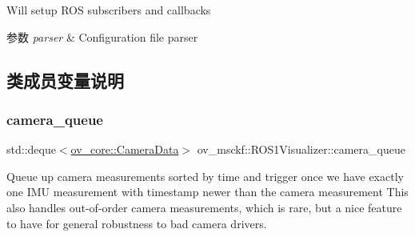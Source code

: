 Will setup R\+OS subscribers and callbacks 


\begin{DoxyParams}{参数}
{\em parser} & Configuration file parser \\
\hline
\end{DoxyParams}


\subsection{类成员变量说明}
\mbox{\label{classov__msckf_1_1ROS1Visualizer_a96e92f8bf544cc689e3fd203d3340e97}} 
\subsubsection{\texorpdfstring{camera\+\_\+queue}{camera\_queue}}
{\footnotesize\ttfamily std\+::deque$<$\hyperlink{structov__core_1_1CameraData}{ov\+\_\+core\+::\+Camera\+Data}$>$ ov\+\_\+msckf\+::\+R\+O\+S1\+Visualizer\+::camera\+\_\+queue\hspace{0.3cm}{\ttfamily [protected]}}

Queue up camera measurements sorted by time and trigger once we have exactly one I\+MU measurement with timestamp newer than the camera measurement This also handles out-\/of-\/order camera measurements, which is rare, but a nice feature to have for general robustness to bad camera drivers. 
